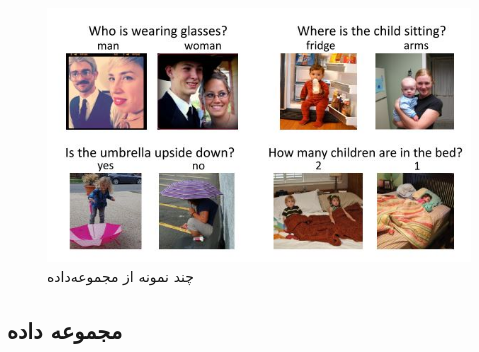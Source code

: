   \begin{figure}[h]
	\centerline{\includegraphics[scale=0.6]{images/VQA2.JPG}}
	\caption[چند نمونه از مجموعه‌داده ]{چند نمونه از مجموعه‌داده  \cite{goyal2017making}}
	\label{fig:vqa2Example}
  \end{figure}

\subsection[مجموعه داده \lr{Visual Madlibs}]{مجموعه داده  \cite{yu2015visual}}


